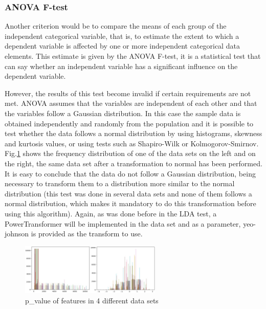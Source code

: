 \subsubsection{ANOVA F-test} %
\label{sec:inserting_tables}
\hspace{10px} Another criterion would be to compare the means of each group of the independent categorical variable, that is, to estimate the extent to which a dependent variable is affected by one or more independent categorical data elements. This estimate is given by the ANOVA F-test, it is a statistical test that can say whether an independent variable has a significant influence on the dependent variable.

However, the results of this test become invalid if certain requirements are not met. ANOVA assumes that the variables are independent of each other and that the variables follow a Gaussian distribution. In this case the sample data is obtained independently and randomly from the population and it is possible to test whether the data follows a normal distribution by using histograms, skewness and kurtosis values, or using tests such as Shapiro-Wilk or Kolmogorov-Smirnov. Fig.\ref{fig:histogram} shows the frequency distribution of one of the data sets on the left and on the right, the same data set after a transformation to normal has been performed. It is easy to conclude that the data do not follow a Gaussian distribution, being necessary to transform them to a distribution more similar to the normal distribution (this test was done in several data sets and none of them follows a normal distribution, which makes it mandatory to do this transformation before using this algorithm). Again, as was done before in the LDA test, a PowerTransformer will be implemented in the data set and as a parameter, yeo-johnson is provided as the transform to use.

\begin{figure}[h]
    \centering
    \includegraphics[width=0.6\textwidth,height=0.15\textheight]{Chapters/Figures/hist_norm.jpg}
    \caption{p\_value of features in 4 different data sets}
    \label{fig:histogram}
\end{figure}

